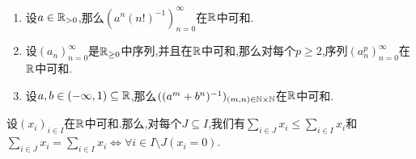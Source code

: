 \begin{example}{}{}
	\begin{enumerate}
		\item 设$a\in\mathbb{R}_{>0}$,那么$(a^{n}(n!)^{-1})_{n=0}^{\infty}$在$\mathbb{R}$中可和.
		\item 设$\left(a_{n}\right)_{n=0}^{\infty}$是$\mathbb{R}_{\geq 0}$中序列,并且在$\mathbb{R}$中可和,那么对每个$p\geq 2$,序列$\left(a_{n}^{p}\right)_{n=0}^{\infty}$在$\mathbb{R}$中可和.
		\item 设$a,b\in\left(-\infty,1\right)\subseteq\mathbb{R}$,那么$((a^{m}+b^{n})^{-1})_{\left(m,n\right)\in\mathbb{N}\times\mathbb{N}}$在$\mathbb{R}$中可和.
	\end{enumerate}
\end{example}

\begin{corollary}{}{}
	设$\left(x_{i}\right)_{i\in I}$在$\mathbb{R}$中可和.那么,对每个$J\subseteq I$,我们有$\sum\limits_{i\in J}x_{i}\leqslant\sum\limits_{i\in I}x_{i}$和$\sum\limits_{i\in J}x_{i}=\sum\limits_{i\in I}x_{i}\iff\forall i\in I\setminus J\left(x_{i}=0\right)$.
\end{corollary}
